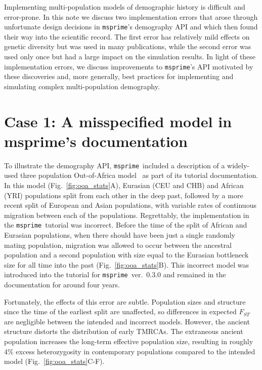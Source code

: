 \documentclass{article}
\newcommand{\msprime}[0]{\texttt{msprime}}
\begin{document}
Implementing multi-population models of demographic history is difficult and error-prone.
In this note we discuss two implementation errors that arose through
unfortunate design decisions in \msprime's demography API and which then found their way
into the scientific record. The first error has relatively mild effects on genetic diversity but was
used in many publications, while the second error was used only once but had a large impact on the
simulation results.
In light of these implementation errors, we discuss improvements to \msprime's API motivated by these
discoveries and, more generally, best practices for implementing and simulating complex multi-population
demography.

\section*{Case 1: A misspecified model in msprime's documentation}

To illustrate the demography API, \msprime\ included a description of a widely-used
three population Out-of-Africa model~\citep{gutenkunst2009inferring}
as part of its tutorial documentation. In this model (Fig.~\ref{fig:ooa_stats}A),
Eurasian (CEU and CHB) and African (YRI) populations split from each other in the deep past,
followed by a more recent split of European and Asian populations, with variable rates of
continuous migration between each of the populations. Regrettably, the implementation in the
\msprime\ tutorial was incorrect. Before the time of the split of African and Eurasian
populations, when there should have been just a single randomly mating population, migration was
allowed to occur between the ancestral population and a second population with size equal to
the Eurasian bottleneck size for all time into the past
(Fig.~\ref{fig:ooa_stats}B). This incorrect model was introduced into
the tutorial for \msprime~ver.~0.3.0 and remained in the documentation for
around four years.

Fortunately, the effects of this error are subtle.
Population sizes and structure since the time of
the earliest split are unaffected, so differences in expected $F_{ST}$ are negligible between
the intended and incorrect models. However, the ancient structure distorts the distribution
of early TMRCAs. The extraneous ancient population increases the long-term effective
population size, resulting in roughly $4\%$ excess heterozygosity in
contemporary populations compared to the intended model
(Fig.~\ref{fig:ooa_stats}C-F).
\end{document}
